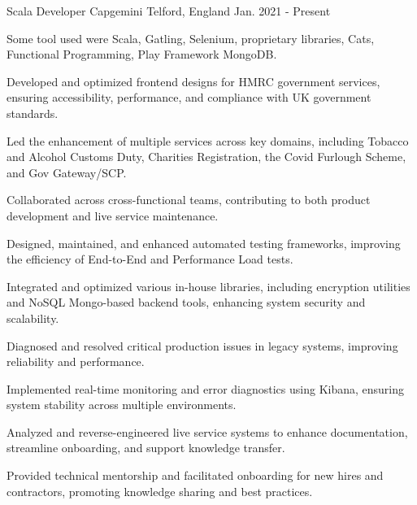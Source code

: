 
\begin{cventries}

  \cventry
    {Scala Developer} %
    {Capgemini} %
    {Telford, England} %
    {Jan. 2021 - Present} %
    {
      \raggedright
      \begin{cvitems}
        \item {Some tool used were Scala, Gatling, Selenium, proprietary libraries, Cats, Functional Programming, Play Framework MongoDB.}
        \item {Developed and optimized frontend designs for HMRC government services, ensuring accessibility, performance, and compliance with UK government standards.}
        \item {Led the enhancement of multiple services across key domains, including Tobacco and Alcohol Customs Duty, Charities Registration, the Covid Furlough Scheme, and Gov Gateway/SCP.}
        \item {Collaborated across cross-functional teams, contributing to both product development and live service maintenance.}
        \item {Designed, maintained, and enhanced automated testing frameworks, improving the efficiency of End-to-End and Performance Load tests.}
        \item {Integrated and optimized various in-house libraries, including encryption utilities and NoSQL Mongo-based backend tools, enhancing system security and scalability.}
        \item {Diagnosed and resolved critical production issues in legacy systems, improving reliability and performance.}
        \item {Implemented real-time monitoring and error diagnostics using Kibana, ensuring system stability across multiple environments.}
        \item {Analyzed and reverse-engineered live service systems to enhance documentation, streamline onboarding, and support knowledge transfer.}
        \item {Provided technical mentorship and facilitated onboarding for new hires and contractors, promoting knowledge sharing and best practices.}

\end{cvitems}}
\end{cventries}
